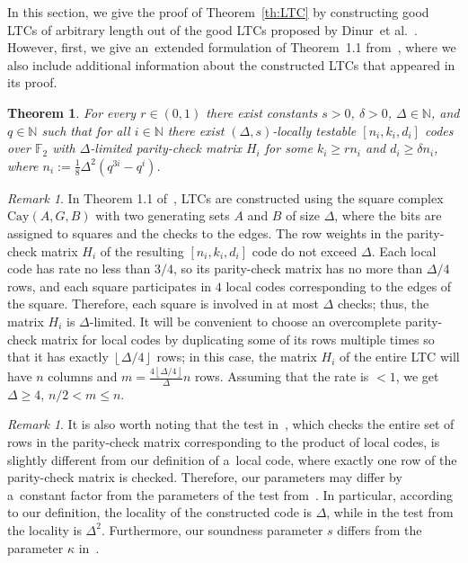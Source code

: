 \documentclass[conference]{IEEEtran}
\newcommand{\floorbr}[1]{\left\lfloor #1\right\rfloor}
\let\ge\geqslant
\theoremstyle{plain}
\newtheorem{exttheorem}{Theorem}
\theoremstyle{definition}
\theoremstyle{remark}
\newtheorem{remark}[theorem]{Remark}
\newcommand{\NN}{\mathbb{N}}
\newcommand{\cay}{\mathrm{Cay}}
\newcommand{\F}{\mathbb{F}}
\begin{document}
In this section, we give the proof of Theorem~\ref{th:LTC} by constructing good LTCs of arbitrary length out of the good LTCs proposed by Dinur~et al.~\cite{Dinur:stoc2022}. 
However, first, we give an~extended formulation of Theorem~1.1 from~\cite{Dinur:stoc2022}, where we also include additional information about the constructed LTCs that appeared in its proof.
\begin{exttheorem}\label{th:Dinur:LTC}
    For every $r\in (0,1)$ there exist constants $s>0$, $\delta>0$, $\Delta\in\NN$, and $q\in\NN$ such that for all $i\in \NN$ there exist $(\Delta,s)$-locally testable $[n_i,k_i,d_i]$ codes over $\F_2$ with $\Delta$-limited parity-check matrix $H_i$ for some $k_i\ge rn_i$ and $d_i\ge\delta n_i$, where $n_i:=\frac18 \Delta^2 (q^{3i}-q^i)$.
\end{exttheorem}


\begin{remark}\label{rm:Dinur:LTC}
In Theorem 1.1 of~\cite{Dinur:stoc2022}, LTCs are constructed using the square complex $\cay(A,G,B)$ with two generating sets $A$ and $B$ of size $\Delta$, where the bits are assigned to squares and the checks to the edges. The row weights in the parity-check matrix $H_i$ of the resulting $[n_i,k_i,d_i]$ code do not exceed $\Delta$. Each local code has rate no less than $3/4$, so its parity-check matrix has no more than $\Delta/4$ rows, and each square participates in $4$ local codes corresponding to the edges of the square. Therefore, each square is involved in at most $\Delta$ checks; thus, the matrix $H_i$ is $\Delta$-limited. It will be convenient to choose an overcomplete parity-check matrix for local codes by duplicating some of its rows multiple times so that it has exactly $\floorbr{\Delta/4}$ rows; in this case, the matrix $H_i$ of the entire LTC will have $n$ columns and $m=\frac{4\floorbr{\Delta/4}}{\Delta}n$ rows. Assuming that the rate is $<1$, we get $\Delta\geq 4$, $n/2<m\leq n$.    
\end{remark}

\begin{remark}
It is also worth noting that the test in~\cite{Dinur:stoc2022}, which checks the entire set of rows in the parity-check matrix corresponding to the product of local codes, is slightly different from our definition of a~local code, where exactly one row of the parity-check matrix is checked. Therefore, our parameters may differ by a~constant factor from the parameters of the test from~\cite{Dinur:stoc2022}. In particular, according to our definition, the locality of the constructed code is $\Delta$, while in the test from~\cite{Dinur:stoc2022} the locality is $\Delta^2$. Furthermore, our soundness parameter $s$ differs from the parameter $\kappa$ in~\cite{Dinur:stoc2022}. 
\end{remark}
\end{document}
